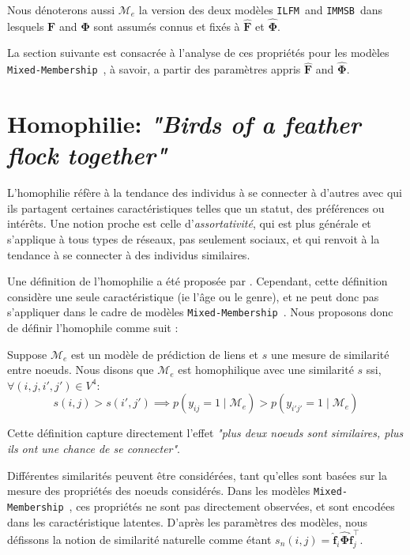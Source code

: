 \documentclass[french]{hermes-journal}
\newcommand{\ilfm}{\texttt{ILFM}}
\newcommand{\immsb}{\texttt{IMMSB}}
\newcommand{\mmm}{\texttt{Mixed-Membership}~}
\newcommand{\pr}{p}
\newcommand{\mat}[1]{\bm{#1}}
\begin{document}
Nous dénoterons aussi $\mathcal{M}_e$ la version des deux modèles \ilfm\ and \immsb\ dans lesquels $\mat{F}$ and $\mat{\Phi}$ sont assumés connus et fixés à $\mat{\hat{F}}$ et  $\mat{\hat{\Phi}}$.

La section suivante est consacrée à l'analyse  de ces propriétés pour les modèles \mmm, à savoir, a partir des paramètres appris $\mat{\hat{F}}$ and $\mat{\hat{\Phi}}$.


\section{Homophilie: \emph{"Birds of a feather flock together"}}
\label{sec:homophily}

L'homophilie réfère à la tendance des individus à se connecter à d'autres avec qui ils partagent certaines caractéristiques telles que un statut, des préférences ou intérêts\cite{mcpherson2001birds,lazarsfeld1954friendship}.   Une notion proche est celle d'\emph{assortativité}, qui est plus générale et s'applique à tous types de réseaux, pas seulement sociaux, et qui renvoit à la tendance à se connecter à des individus similaires.


Une définition de l'homophilie a été proposée par \cite{la2010randomization}. Cependant, cette définition considère une seule caractéristique (ie l'âge ou le genre), et ne peut donc pas s'appliquer dans le cadre de modèles \mmm. Nous proposons donc de définir l'homophile comme suit : 
\begin{definition}[Homophilie] \label{def:homophily}
    Suppose $\mathcal{M}_e$ est un modèle de prédiction de liens et $s$ une mesure de similarité entre noeuds. Nous disons que $\mathcal{M}_e$ est homophilique avec une similarité $s$ ssi, $\forall (i,j,i',j') \in V^4$:
\begin{equation}
s(i,j) > s(i',j')  \implies \pr(y_{ij}=1 \mid \mathcal{M}_e) > \pr(y_{i'j'}=1  \mid \mathcal{M}_e) \nonumber
\end{equation}

\end{definition}

\noindent Cette définition capture directement l'effet \emph{"plus deux noeuds sont similaires, plus ils ont une chance de se connecter"}. 

Différentes similarités peuvent être considérées, tant qu'elles sont basées sur la mesure des propriétés des noeuds considérés. Dans les modèles \mmm, ces propriétés ne sont pas directement observées, et sont encodées dans les caractéristique latentes. D'après les paramètres des modèles, nous défissons la notion de similarité naturelle comme étant $s_n(i,j) = \mat{\hat{f}}_{i} \mat{\hat{\Phi}} \mat{\hat{f}}_j^\top$.
\end{document}
